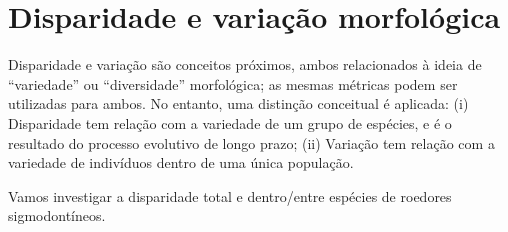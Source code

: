 \documentclass[
]{book}
\begin{document}
\chapter{Disparidade e variação morfológica}\label{disparidade-e-variauxe7uxe3o-morfoluxf3gica}

Disparidade e variação são conceitos próximos, ambos relacionados à ideia de ``variedade'' ou ``diversidade'' morfológica; as mesmas métricas podem ser utilizadas para ambos. No entanto, uma distinção conceitual é aplicada: (i) Disparidade tem relação com a variedade de um grupo de espécies, e é o resultado do processo evolutivo de longo prazo; (ii) Variação tem relação com a variedade de indivíduos dentro de uma única população.

Vamos investigar a disparidade total e dentro/entre espécies de roedores sigmodontíneos.
\end{document}
